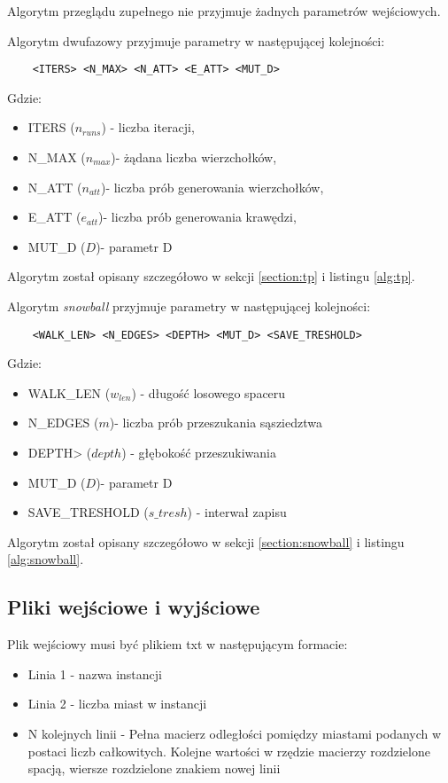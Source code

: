 Algorytm przeglądu zupełnego nie przyjmuje żadnych parametrów wejściowych.

Algorytm dwufazowy przyjmuje parametry w następującej kolejności:

\begin{lstlisting}
    <ITERS> <N_MAX> <N_ATT> <E_ATT> <MUT_D>
\end{lstlisting}
Gdzie:
\begin{itemize}
    \item ITERS ($n_{runs}$) - liczba iteracji,
    \item N\_MAX ($n_{max}$)- żądana liczba wierzchołków,
    \item N\_ATT ($n_{att}$)- liczba prób generowania wierzchołków,
    \item E\_ATT ($e_{att}$)- liczba prób generowania krawędzi,
    \item MUT\_D ($D$)- parametr D
\end{itemize}

Algorytm został opisany szczegółowo w sekcji \ref{section:tp} i listingu \ref{alg:tp}.

Algorytm \textit{snowball} przyjmuje parametry w następującej kolejności:

\begin{lstlisting}
    <WALK_LEN> <N_EDGES> <DEPTH> <MUT_D> <SAVE_TRESHOLD>
\end{lstlisting}
Gdzie:
\begin{itemize}
    \item WALK\_LEN ($w_{len}$) - długość losowego spaceru
    \item N\_EDGES ($m$)- liczba prób przeszukania sąsziedztwa
    \item DEPTH> ($depth$) - głębokość przeszukiwania
    \item MUT\_D ($D$)- parametr D
    \item SAVE\_TRESHOLD ($s\_tresh$) - interwał zapisu
\end{itemize}

Algorytm został opisany szczegółowo w sekcji \ref{section:snowball} i listingu \ref{alg:snowball}.

\subsection{Pliki wejściowe i wyjściowe}

Plik wejściowy musi być plikiem txt w następującym formacie:
\begin{itemize}
    \item Linia 1 - nazwa instancji
    \item Linia 2 - liczba miast w instancji
    \item N kolejnych linii - Pełna macierz odległości pomiędzy miastami podanych w postaci liczb całkowitych.
          Kolejne wartości w rzędzie macierzy rozdzielone spacją, wiersze rozdzielone znakiem nowej linii
\end{itemize}


